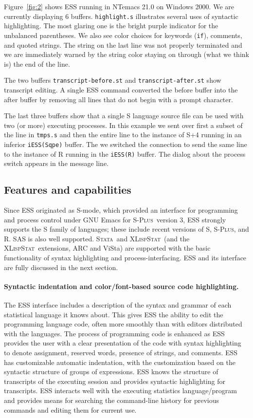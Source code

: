 \documentclass{article}
\newcommand*{\Splus}{\textsc{S-Plus}}
\newcommand*{\XLispStat}{\textsc{XLispStat}}
\newcommand*{\Stata}{\textsc{Stata}}
\newcommand{\stexttt}[1]{{\small\texttt{#1}}}
\begin{document}
Figure~\ref{fig:2} shows ESS running in NTemacs 21.0 on Windows 2000.
We are currently displaying 6 buffers.  \stexttt{highlight.s}
illustrates several uses of syntactic highlighting.  The most glaring
one is the bright purple indicator for the unbalanced parentheses.  We
also see color choices for keywords (\stexttt{if}), comments, and
quoted strings.  The string on the last line was not properly
terminated and we are immediately warned by the string color staying
on through (what we think is) the end of the line.

The two buffers \stexttt{transcript-before.st} and
\stexttt{transcript-after.st} show transcript editing.  A single ESS
command converted the before buffer into the after buffer by removing
all lines that do not begin with a prompt character.

The last three buffers show that a single S language source file can
be used with two (or more) executing processes.  In this example we
sent over first a subset of the line in \stexttt{tmps.s} and then the
entire line to the instance of S+4 running in an inferior
\stexttt{iESS(Sqpe)} buffer.  The we switched the connection to send
the same line to the instance of R running in the \stexttt{iESS(R)}
buffer.  The dialog about the process switch appears in the message line.


\subsection{Features and capabilities}
\label{sec:ESS:features}

Since ESS originated as S-mode, which provided an interface for
programming and process control under GNU Emacs for \Splus\ version 3,
ESS strongly supports the S family of languages; these include recent
versions of S, \Splus, and R.  SAS is also well supported.  \Stata\
and \XLispStat\ (and the \XLispStat\ extensions, ARC and ViSta) are
supported with the basic functionality of syntax highlighting and
process-interfacing.  ESS and its interface are fully discussed in the
next section.

\paragraph{Syntactic indentation and color/font-based source code
  highlighting.}
The ESS interface includes a description of the syntax and grammar of
each statistical language it knows about.  This gives ESS the ability
to edit the programming language code, often more smoothly than with
editors distributed with the languages.  The process of programming
code is enhanced as ESS provides the user with a clear presentation of
the code with syntax highlighting to denote assignment, reserved
words, presence of strings, and comments.  ESS has customizable
automatic indentation, with the customization based on the syntactic
structure of groups of expressions.  ESS knows the structure of
transcripts of the executing session and provides syntactic highlighting
for transcripts.  ESS interacts well with the executing statistics
language/program and
provides means for searching the command-line history for previous
commands and editing them for current use.
\end{document}
